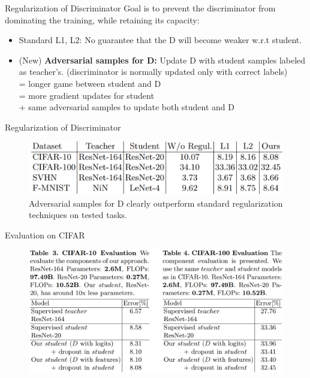 \documentclass{beamer}
\begin{document}
\begin{frame}{Regularization of Discriminator}
Goal is to prevent the discriminator
from dominating the training, while retaining its capacity:
\begin{itemize}
\item Standard L1, L2: No guarantee that the D will become weaker w.r.t student.
\item (New) \textbf{Adversarial samples for D:} Update D with student samples labeled as teacher's. (discriminator is normally updated only with correct labels) \\
= longer game between student and D \\
= more gradient updates for student \\
+ same adversarial samples to update both student and D 
\end{itemize}
\end{frame}
\begin{frame}{Regularization of Discriminator}

\begin{figure}[h]
\includegraphics[scale=0.45]{img/regularization}
\caption{Adversarial samples for D clearly outperform standard regularization techniques on tested tasks.}
\end{figure}

\end{frame}
\begin{frame}{Evaluation on CIFAR}

\begin{figure}[h]
\includegraphics[width=\textwidth]{img/cifar_dropout}
\end{figure}

\end{frame}
\end{document}
